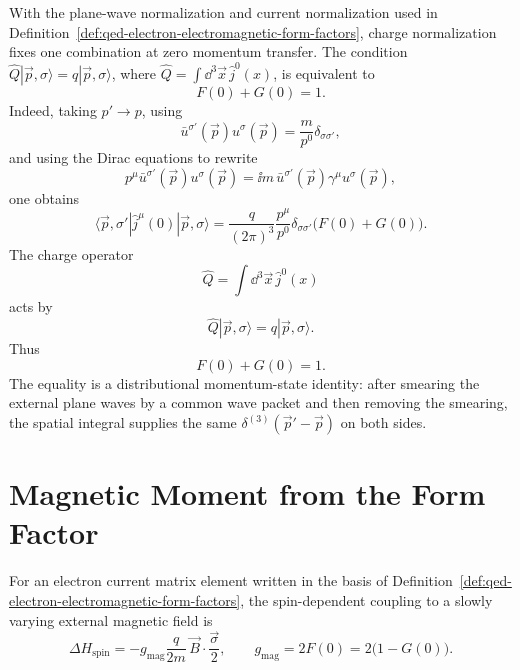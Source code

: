 With the plane-wave normalization and current normalization used in
Definition~\ref{def:qed-electron-electromagnetic-form-factors}, charge
normalization fixes one combination at zero momentum transfer.  The condition
\(\widehat Q|\vec p,\sigma\rangle=q|\vec p,\sigma\rangle\), where
\(\widehat Q=\int\dd^3\vec x\,\widehat j^0(x)\), is equivalent to
\begin{equation}
  F(0)+G(0)=1 .
  \label{eq:qed-electron-charge-normalization}
\end{equation}
Indeed, taking
\(p'\to p\), using
\[
  \bar u^{\sigma'}(\vec p)u^\sigma(\vec p)
  =
  \frac{m}{p^0}\delta_{\sigma\sigma'},
\]
and using the Dirac equations to rewrite
\[
  p^\mu\bar u^{\sigma'}(\vec p)u^\sigma(\vec p)
  =
  \ii m\,\bar u^{\sigma'}(\vec p)\gamma^\mu u^\sigma(\vec p),
\]
one obtains
\[
  \langle\vec p,\sigma'|\widehat j^\mu(0)|\vec p,\sigma\rangle
  =
  \frac{q}{(2\pi)^3}
  \frac{p^\mu}{p^0}
  \delta_{\sigma\sigma'}\bigl(F(0)+G(0)\bigr).
\]
The charge operator
\[
  \widehat Q=\int\dd^3\vec x\,\widehat j^0(x)
\]
acts by
\[
  \widehat Q|\vec p,\sigma\rangle=q|\vec p,\sigma\rangle .
\]
Thus
\[
  F(0)+G(0)=1.
\]
The equality is a distributional momentum-state identity: after smearing the
external plane waves by a common wave packet and then removing the smearing,
the spatial integral supplies the same
\(\delta^{(3)}(\vec p'-\vec p)\) on both sides.

\section{Magnetic Moment from the Form Factor}

\begin{proposition}
\label{prop:qed-magnetic-factor-from-form-factor}
For an electron current matrix element written in the basis of
Definition~\ref{def:qed-electron-electromagnetic-form-factors}, the
spin-dependent coupling to a slowly varying external magnetic field is
\[
  \Delta H_{\mathrm{spin}}
  =
  -g_{\mathrm{mag}}\frac{q}{2m}\,
  \vec B\cdot\frac{\vec\sigma}{2},
  \qquad
  g_{\mathrm{mag}}=2F(0)=2\bigl(1-G(0)\bigr).
\]
\end{proposition}

